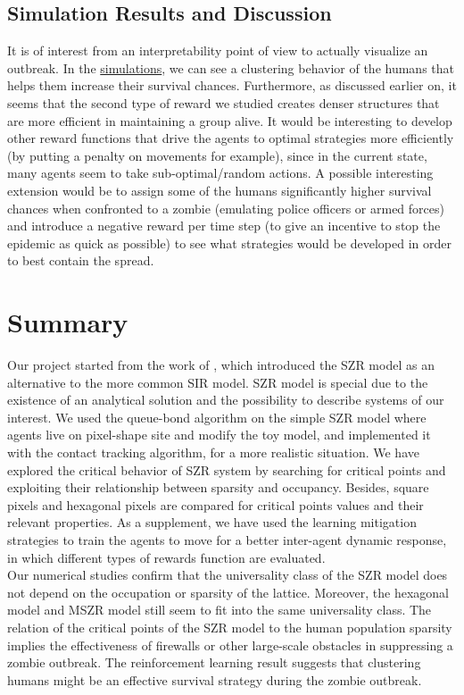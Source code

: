 \documentclass[11pt]{article}
\begin{document}
\subsection{Simulation Results and Discussion}
It is of interest from an interpretability point of view to actually visualize an outbreak. In the \href{https://drive.google.com/drive/folders/1BdjtIzm04ceutauC5-CTmtW1EyJ8QkX4?usp=sharing}{simulations}, we can see a clustering behavior of the humans that helps them increase their survival chances. Furthermore, as discussed earlier on, it seems that the second type of reward we studied creates denser structures that are more efficient in maintaining a group alive. It would be interesting to develop other reward functions that drive the agents to optimal strategies more efficiently (by putting a penalty on movements for example), since in the current state, many agents seem to take sub-optimal/random actions. A possible interesting extension would be to assign some of the humans significantly higher survival chances when confronted to a zombie (emulating police officers or armed forces) and introduce a negative reward per time step (to give an incentive to stop the epidemic as quick as possible) to see what strategies would be developed in order to best contain the spread.

\section{Summary}
Our project started from the work of \cite{Zombies}, which introduced the SZR model as an alternative to the more common SIR model. SZR model is special due to the existence of an analytical solution and the possibility to describe systems of our interest. We used the queue-bond algorithm on the simple SZR model where agents live on pixel-shape site and modify the toy model, and implemented it with the contact tracking algorithm, for a more realistic situation. We have explored the critical behavior of SZR system by searching for critical points and exploiting their relationship between sparsity and occupancy. Besides, square pixels and hexagonal pixels are compared for critical points values and their relevant properties. As a supplement, we have used the learning mitigation strategies to train the agents to move for a better inter-agent dynamic response, in which different types of rewards function are evaluated.\\

Our numerical studies confirm that the universality class of the SZR model does not depend on the occupation or sparsity of the lattice. Moreover, the hexagonal model and MSZR model still seem to fit into the same universality class. The relation of the critical points of the SZR model to the human population sparsity implies the effectiveness of firewalls or other large-scale obstacles in suppressing a zombie outbreak. The reinforcement learning result suggests that clustering humans might be an effective survival strategy during the zombie outbreak.
\end{document}
